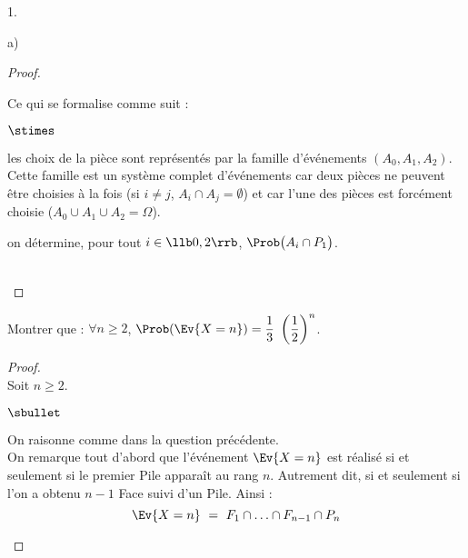 \documentclass[11pt]{article}%
\begin{document}
\begin{noliste}{1.}
\begin{noliste}{a)}
\begin{proof}
\begin{remark}
        Ce qui se formalise comme suit :
        \begin{noliste}{$\stimes$}
        \item les choix de la pièce sont représentés par la famille
          d'événements $(A_0, A_1, A_2)$.\\
          Cette famille est un système complet d'événements car deux
          pièces ne peuvent être choisies à la fois (si $i \neq j$,
          $A_i \cap A_j = \emptyset$) et car l'une des pièces est
          forcément choisie ($A_0 \cup A_1 \cup A_2 = \Omega$).
        \item on détermine, pour tout $i \in \llb 0, 2 \rrb$,
          $\Prob\big( A_i \cap P_1 \big)$.
        \end{noliste}
      \end{remark}~\\[-1.4cm]
    \end{proof}
    

\newpage


  \item Montrer que : $\forall n \geq 2$, $\Prob(\Ev{X = n}) =
    \dfrac{1}{3} \ \left( \dfrac{1}{2} \right)^n$.

    \begin{proof}~\\%
      Soit $n \geq 2$.
      \begin{noliste}{$\sbullet$}
      \item On raisonne comme dans la question précédente.\\
        On remarque tout d'abord que l'événement $\Ev{X = n}$ est
        réalisé si et seulement si le premier Pile apparaît au rang
        $n$. Autrement dit, si et seulement si l'on a obtenu $n-1$
        Face suivi d'un Pile. Ainsi :
        \[
        \Ev{X = n} \ = \ F_1 \cap \ldots \cap F_{n-1} \cap P_n
        \]


\end{noliste}
\end{proof}
\end{noliste}
\end{noliste}
\end{document}

